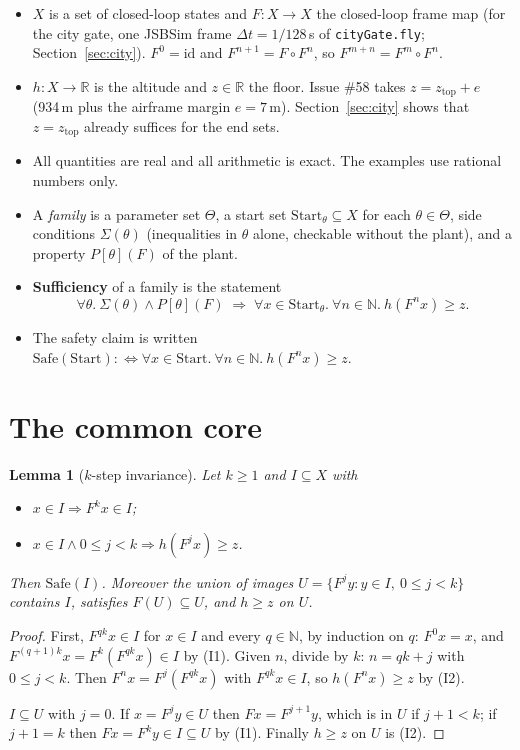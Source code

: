 \documentclass[11pt]{article}
\newtheorem{lemma}[theorem]{Lemma}
\theoremstyle{definition}
\newcommand{\R}{\mathbb{R}}
\newcommand{\N}{\mathbb{N}}
\newcommand{\Start}{\ensuremath{\mathrm{Start}}}
\newcommand{\zTop}{z_{\mathrm{top}}}
\begin{document}
\begin{itemize}
\item $X$ is a set of closed-loop states and $F : X \to X$ the closed-loop frame map (for the city gate, one JSBSim frame $\Delta t = 1/128$\,s of \texttt{cityGate.fly}; Section~\ref{sec:city}). $F^0 = \mathrm{id}$ and $F^{n+1} = F \circ F^n$, so $F^{m+n} = F^m \circ F^n$.
\item $h : X \to \R$ is the altitude and $z \in \R$ the floor. Issue \#58 takes $z = \zTop + e$ (934\,m plus the airframe margin $e = 7$\,m). Section~\ref{sec:city} shows that $z = \zTop$ already suffices for the end sets.
\item All quantities are real and all arithmetic is exact. The examples use rational numbers only.
\item A \emph{family} is a parameter set $\Theta$, a start set $\Start_\theta \subseteq X$ for each $\theta \in \Theta$, side conditions $\Sigma(\theta)$ (inequalities in $\theta$ alone, checkable without the plant), and a property $P[\theta](F)$ of the plant.
\item \textbf{Sufficiency} of a family is the statement
\[ \forall \theta.\ \Sigma(\theta) \wedge P[\theta](F) \;\Longrightarrow\; \forall x \in \Start_\theta.\ \forall n \in \N.\ h(F^n x) \ge z. \]
\item The safety claim is written $\mathrm{Safe}(\Start) :\iff \forall x \in \Start.\ \forall n \in \N.\ h(F^n x) \ge z$.
\end{itemize}

\section{The common core}\label{sec:core}

\begin{lemma}[$k$-step invariance]\label{lem:core}
Let $k \ge 1$ and $I \subseteq X$ with
\begin{itemize}
\item[(I1)] $x \in I \Rightarrow F^k x \in I$;
\item[(I2)] $x \in I \wedge 0 \le j < k \Rightarrow h(F^j x) \ge z$.
\end{itemize}
Then $\mathrm{Safe}(I)$. Moreover the union of images $U = \{F^j y : y \in I,\ 0 \le j < k\}$ contains $I$, satisfies $F(U) \subseteq U$, and $h \ge z$ on $U$.
\end{lemma}
\begin{proof}
First, $F^{qk} x \in I$ for $x \in I$ and every $q \in \N$, by induction on $q$: $F^0 x = x$, and $F^{(q+1)k} x = F^k(F^{qk} x) \in I$ by (I1). Given $n$, divide by $k$: $n = qk + j$ with $0 \le j < k$. Then $F^n x = F^j(F^{qk} x)$ with $F^{qk} x \in I$, so $h(F^n x) \ge z$ by (I2).

$I \subseteq U$ with $j = 0$. If $x = F^j y \in U$ then $F x = F^{j+1} y$, which is in $U$ if $j + 1 < k$; if $j + 1 = k$ then $F x = F^k y \in I \subseteq U$ by (I1). Finally $h \ge z$ on $U$ is (I2).
\end{proof}
\end{document}
